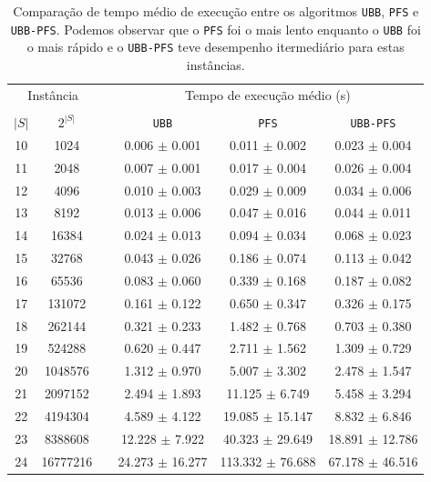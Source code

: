 \documentclass[12pt]{article}
\newcommand{\algname}[1]{\texttt{#1}}
\begin{document}
\begin{table}
\centering
\footnotesize
\caption{Comparação de tempo médio de execução entre os algoritmos
\algname{UBB}, \algname{PFS} e \algname{UBB-PFS}. Podemos observar que
o \algname{PFS} foi o mais lento enquanto o \algname{UBB} foi o mais
rápido e o \algname{UBB-PFS} teve desempenho itermediário para estas
instâncias.}
\label{tab:ubbpfs_vs_ubb_vs_pfs_time}
\begin{tabular}{cc c ccc}
\toprule
\multicolumn{2}{c}{Instância} & \phantom{} & \multicolumn{3}{c}{Tempo de execução médio (s)}\\
\cline{1-2}\cline{4-6}\\
$|S|$ & $2^{|S|}$ && \algname{UBB} & \algname{PFS} & \algname{UBB-PFS}  \\
10 &    1024 &&  0.006 $\pm$ 0.001 & 0.011 $\pm$ 0.002 & 0.023 $\pm$ 0.004 \\
11 &    2048 &&  0.007 $\pm$ 0.001 & 0.017 $\pm$ 0.004 & 0.026 $\pm$ 0.004 \\
12 &    4096 &&  0.010 $\pm$ 0.003 & 0.029 $\pm$ 0.009 & 0.034 $\pm$ 0.006 \\
13 &    8192 &&  0.013 $\pm$ 0.006 & 0.047 $\pm$ 0.016 & 0.044 $\pm$ 0.011 \\
14 &   16384 &&  0.024 $\pm$ 0.013 & 0.094 $\pm$ 0.034 & 0.068 $\pm$ 0.023 \\
15 &   32768 &&  0.043 $\pm$ 0.026 & 0.186 $\pm$ 0.074 & 0.113 $\pm$ 0.042 \\
16 &   65536 &&  0.083 $\pm$ 0.060 & 0.339 $\pm$ 0.168 & 0.187 $\pm$ 0.082 \\
17 &  131072 &&  0.161 $\pm$ 0.122 & 0.650 $\pm$ 0.347 & 0.326 $\pm$ 0.175 \\
18 &  262144 &&  0.321 $\pm$ 0.233 & 1.482 $\pm$ 0.768 & 0.703 $\pm$ 0.380 \\
19 &  524288 &&  0.620 $\pm$ 0.447 & 2.711 $\pm$ 1.562 & 1.309 $\pm$ 0.729 \\
20 & 1048576 &&  1.312 $\pm$ 0.970 & 5.007 $\pm$ 3.302 & 2.478 $\pm$ 1.547 \\
21 & 2097152 &&  2.494 $\pm$ 1.893 & 11.125 $\pm$ 6.749 & 5.458 $\pm$ 3.294 \\
22 & 4194304 &&  4.589 $\pm$ 4.122 & 19.085 $\pm$ 15.147 & 8.832 $\pm$ 6.846 \\
23 & 8388608 &&  12.228 $\pm$ 7.922 & 40.323 $\pm$ 29.649 & 18.891 $\pm$ 12.786 \\
24 & 16777216 &&  24.273 $\pm$ 16.277 & 113.332 $\pm$ 76.688 & 67.178 $\pm$ 46.516 \\
\bottomrule
\end{tabular}
\end{table}
\end{document}
